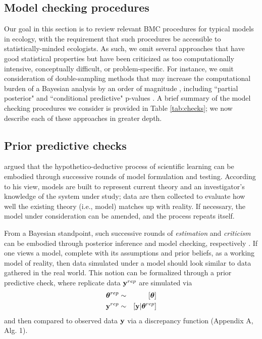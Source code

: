 \documentclass[12pt,english]{article}
\begin{document}
\begin{spacing}{1.9}
\section{Model checking procedures}

Our goal in this section is to review relevant BMC procedures for
typical models in ecology, with the requirement that such procedures
be accessible to statistically-minded ecologists.  As such, we omit
several approaches that have good statistical properties but have been
criticized \citep[e.g.,][]{Johnson2007b,Zhang2014} as too
computationally intensive, conceptually difficult, or
problem-specific.  For instance, we omit consideration of
double-sampling methods that may increase the computational burden of
a Bayesian analysis by an order of magnitude \citep{Johnson2007b},
including ``partial posterior" and ``conditional predictive" p-values
\citep[e.g.,][]{BayarriBerger1999,RobinsEtAl2000,BayarriCastellanos2007}.
A brief summary of the model checking procedures we consider is
provided in Table \ref{tab:checks}; we now describe each of these
approaches in greater depth.

\subsection{Prior predictive checks}

\citet{Box1980} argued that the hypothetico-deductive process of
scientific learning can be embodied through successive rounds of model
formulation and testing. According to his view, models are built to
represent current theory and an investigator's knowledge of the system
under study; data are then collected to evaluate how well the existing
theory (i.e., model) matches up with reality.  If necessary, the model
under consideration can be amended, and the process repeats itself.

From a Bayesian standpoint, such successive rounds of
\textit{estimation} and \textit{criticism} can be embodied through
posterior inference and model checking, respectively \citep{Box1980}.
If one views a model, complete with its assumptions and prior beliefs,
as a working model of reality, then data simulated under a model
should look similar to data gathered in the real world.  This notion
can be formalized through a prior predictive check, where replicate
data ${\bf y}^{rep}$ are simulated via
\begin{eqnarray}
  \label{eq:prior}
  \boldsymbol{\theta}^{rep} & \sim & [\boldsymbol{\theta}] \\
  {\bf y}^{rep} & \sim & [{\bf y}|\boldsymbol{\theta}^{rep}] \nonumber
\end{eqnarray}
and then compared to observed data ${\bf y}$ via a discrepancy function
(Appendix A, Alg. 1).


\end{spacing}
\end{document}
